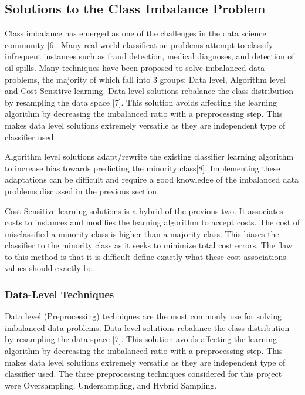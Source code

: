 \subsection{Solutions to the Class Imbalance Problem}
Class imbalance has emerged as one of the challenges in the data science community [6]. Many real world classification problems attempt to classify infrequent instances such as fraud detection, medical diagnoses, and detection of oil spills. Many techniques have been proposed to solve imbalanced data problems, the majority of which fall into 3 groups: Data level, Algorithm level and Cost Sensitive learning.
Data level solutions rebalance the class distribution by resampling the data space [7]. This solution avoids affecting the learning algorithm by decreasing the imbalanced ratio with a preprocessing step. This makes data level solutions extremely versatile as they are independent type of classifier used.

Algorithm level solutions adapt/rewrite the existing classifier learning algorithm to increase bias towards predicting the minority class[8]. Implementing these adaptations can be difficult and require a good knowledge of the imbalanced data problems discussed in the previous section.

Cost Sensitive learning solutions is a hybrid of the previous two. It associates costs to instances and modifies the learning algorithm to accept costs. The cost of misclassified a minority class is higher than a majority class. This biases the classifier to the minority class as it seeks to minimize total cost errors. The flaw to this method is that it is difficult define exactly what these cost associations values should exactly be.

\subsubsection{Data-Level Techniques}
Data level (Preprocessing) techniques are the most commonly use for solving imbalanced data problems. Data level solutions rebalance the class distribution by resampling the data space [7]. This solution avoids affecting the learning algorithm by decreasing the imbalanced ratio with a preprocessing step. This makes data level solutions extremely versatile as they are independent type of classifier used. The three preprocessing techniques considered for this project were Oversampling, Undersampling, and Hybrid Sampling.

